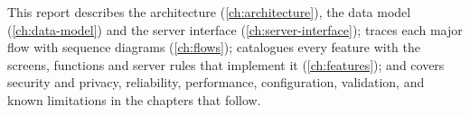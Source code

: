 This report describes the architecture (\cref{ch:architecture}), the data model (\cref{ch:data-model})
and the server interface (\cref{ch:server-interface}); traces each major flow with sequence diagrams
(\cref{ch:flows}); catalogues every feature with the screens, functions and server rules that implement
it (\cref{ch:features}); and covers security and privacy, reliability, performance, configuration,
validation, and known limitations in the chapters that follow.

\clearpage
{\hypersetup{linkcolor=ink}\tableofcontents}
\clearpage
\listoffigures
\listoftables
